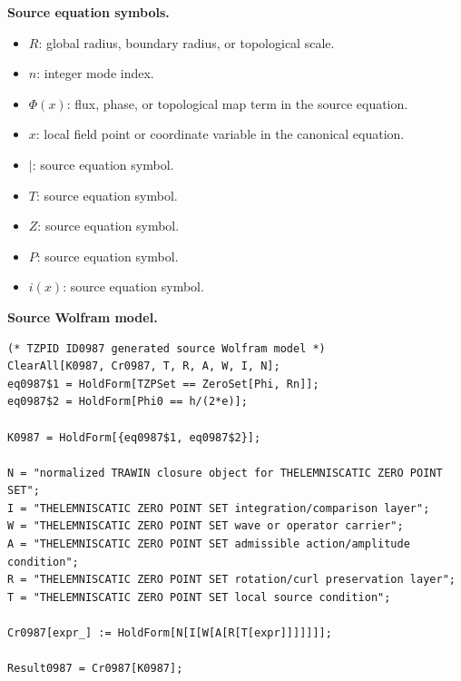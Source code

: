 \begin{minipage}[t]{0.49\linewidth}
\begingroup
\small
\raggedright
\textbf{Source equation symbols.}\par
\begin{itemize}[leftmargin=1.35em,itemsep=1pt,topsep=1pt,parsep=0pt]
    \item $R$: global radius, boundary radius, or topological scale.
    \item $n$: integer mode index.
    \item $\Phi(x)$: flux, phase, or topological map term in the source equation.
    \item $x$: local field point or coordinate variable in the canonical equation.
    \item $\mid$: source equation symbol.
    \item $T$: source equation symbol.
    \item $Z$: source equation symbol.
    \item $P$: source equation symbol.
    \item $i(x)$: source equation symbol.
\end{itemize}
\endgroup
\end{minipage}\hfill
\begin{minipage}[t]{0.47\linewidth}
\begingroup
\scriptsize
\raggedright
\textbf{Source Wolfram model.}\par
\begin{Verbatim}[fontsize=\tiny,breaklines=true,breakanywhere=true]
(* TZPID ID0987 generated source Wolfram model *)
ClearAll[K0987, Cr0987, T, R, A, W, I, N];
eq0987$1 = HoldForm[TZPSet == ZeroSet[Phi, Rn]];
eq0987$2 = HoldForm[Phi0 == h/(2*e)];

K0987 = HoldForm[{eq0987$1, eq0987$2}];

N = "normalized TRAWIN closure object for THELEMNISCATIC ZERO POINT SET";
I = "THELEMNISCATIC ZERO POINT SET integration/comparison layer";
W = "THELEMNISCATIC ZERO POINT SET wave or operator carrier";
A = "THELEMNISCATIC ZERO POINT SET admissible action/amplitude condition";
R = "THELEMNISCATIC ZERO POINT SET rotation/curl preservation layer";
T = "THELEMNISCATIC ZERO POINT SET local source condition";

Cr0987[expr_] := HoldForm[N[I[W[A[R[T[expr]]]]]]];

Result0987 = Cr0987[K0987];
\end{Verbatim}
\endgroup
\end{minipage}

